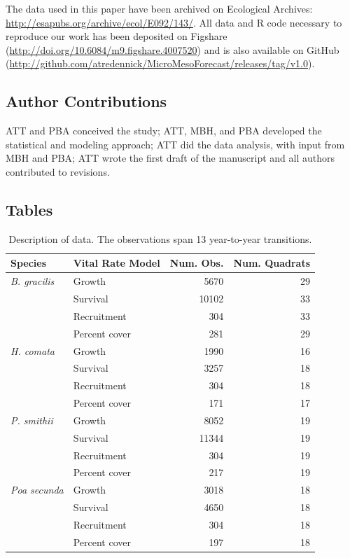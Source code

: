 \documentclass[12pt,]{article}
\begin{document}
The data used in this paper have been archived on Ecological Archives:
\url{http://esapubs.org/archive/ecol/E092/143/}. All data and R code
necessary to reproduce our work has been deposited on Figshare
(\url{http://doi.org/10.6084/m9.figshare.4007520}) and is also available
on GitHub
(\url{http://github.com/atredennick/MicroMesoForecast/releases/tag/v1.0}).

\subsection{Author Contributions}\label{author-contributions}

ATT and PBA conceived the study; ATT, MBH, and PBA developed the
statistical and modeling approach; ATT did the data analysis, with input
from MBH and PBA; ATT wrote the first draft of the manuscript and all
authors contributed to revisions.

\pagebreak{}

\subsection{Tables}\label{tables}

\begin{table}[ht]
\centering
\caption{Description of data. The observations span 13 year-to-year transitions.} 
\begin{tabular}{llrr}
  \hline
Species & Vital Rate Model & Num. Obs. & Num. Quadrats\\ 
  \hline
  \emph{B. gracilis} & Growth & 5670 & 29 \\ 
       & Survival & 10102 & 33 \\ 
       & Recruitment & 304 & 33 \\ 
       & Percent cover & 281 & 29 \\ 
  \rule{0pt}{3ex} \emph{H. comata} & Growth & 1990 & 16 \\ 
       & Survival & 3257 & 18 \\ 
       & Recruitment & 304 & 18 \\ 
       & Percent cover & 171 & 17 \\ 
  \rule{0pt}{3ex} \emph{P. smithii} & Growth & 8052 & 19 \\ 
       & Survival & 11344 & 19 \\ 
       & Recruitment & 304 & 19 \\ 
       & Percent cover & 217 & 19 \\ 
  \rule{0pt}{3ex} \emph{Poa secunda} & Growth & 3018 & 18 \\ 
       & Survival & 4650 & 18 \\ 
       & Recruitment & 304 & 18 \\ 
       & Percent cover & 197 & 18 \\ 
   \hline
\end{tabular}
\end{table}
\end{document}
